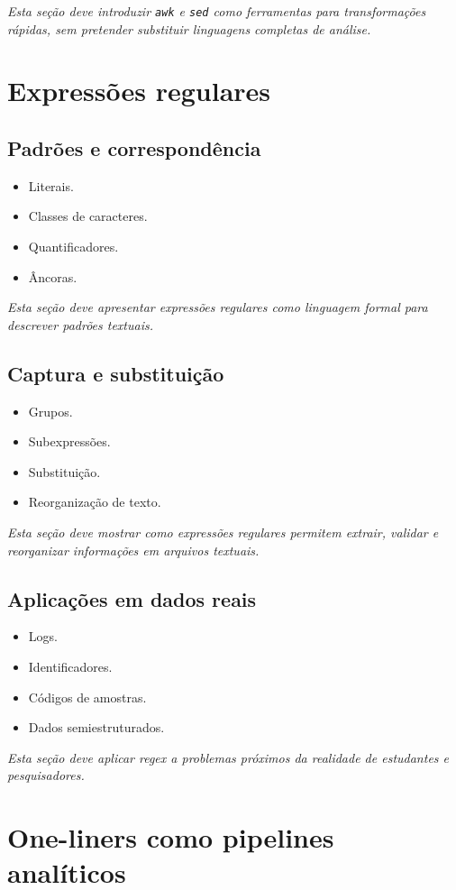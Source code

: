 \documentclass[12pt,openany]{book}
\newcommand{\placeholder}[1]{
    \par\medskip
    \noindent\textit{#1}
    \par\medskip
}
\newcommand{\topicos}[1]{
    \begin{itemize}
        #1
    \end{itemize}
}
\begin{document}
\begin{refsection}
\placeholder{Esta seção deve introduzir \texttt{awk} e \texttt{sed} como ferramentas para transformações rápidas, sem pretender substituir linguagens completas de análise.}

\chapter{Expressões regulares}

\section{Padrões e correspondência}

\topicos{
    \item Literais.
    \item Classes de caracteres.
    \item Quantificadores.
    \item Âncoras.
}

\placeholder{Esta seção deve apresentar expressões regulares como linguagem formal para descrever padrões textuais.}

\section{Captura e substituição}

\topicos{
    \item Grupos.
    \item Subexpressões.
    \item Substituição.
    \item Reorganização de texto.
}

\placeholder{Esta seção deve mostrar como expressões regulares permitem extrair, validar e reorganizar informações em arquivos textuais.}

\section{Aplicações em dados reais}

\topicos{
    \item Logs.
    \item Identificadores.
    \item Códigos de amostras.
    \item Dados semiestruturados.
}

\placeholder{Esta seção deve aplicar regex a problemas próximos da realidade de estudantes e pesquisadores.}

\chapter{One-liners como pipelines analíticos}


\end{refsection}
\end{document}
